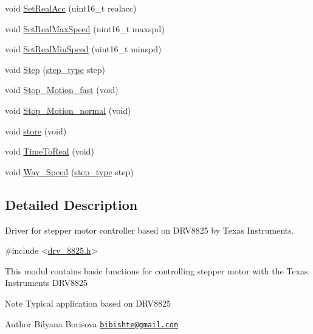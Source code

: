 \begin{DoxyCompactItemize}
\item 
void \hyperlink{group__DRV8825_gaf272b22659980a7a5b9be13378963f67}{Set\-Real\-Acc} (uint16\-\_\-t realacc)
\item 
void \hyperlink{group__DRV8825_ga544f7d7cdcd1fc93afaaa833d1086654}{Set\-Real\-Max\-Speed} (uint16\-\_\-t maxspd)
\item 
void \hyperlink{group__DRV8825_gaf589e1659ecdbe47a83571e1368dc0e2}{Set\-Real\-Min\-Speed} (uint16\-\_\-t minspd)
\item 
void \hyperlink{group__DRV8825_ga7920069eba0a349a19a7e5af32321ad8}{Step} (\hyperlink{group__DRV8825_ga3af682b92aa259509aea217f6dc64356}{step\-\_\-type} step)
\item 
void \hyperlink{group__DRV8825_ga1db502f9943a62943380a04ba0bd52cb}{Stop\-\_\-\-Motion\-\_\-fast} (void)
\item 
void \hyperlink{group__DRV8825_ga95c2965416e69e644b9f5a482707ae9f}{Stop\-\_\-\-Motion\-\_\-normal} (void)
\item 
void \hyperlink{group__DRV8825_gaaefaac2ed4c54f2008d8d236392c7261}{store} (void)
\item 
void \hyperlink{group__DRV8825_gaec239a01fef85140bc7c12fa612f421b}{Time\-To\-Real} (void)
\item 
void \hyperlink{group__DRV8825_ga102f936b773a4a26032cc6b8cd1a273d}{Way\-\_\-\-Speed} (\hyperlink{group__DRV8825_ga3af682b92aa259509aea217f6dc64356}{step\-\_\-type} step)
\end{DoxyCompactItemize}


\subsection{Detailed Description}
Driver for stepper motor controller based on D\-R\-V8825 by Texas Instruments. 
\begin{DoxyCode}
\textcolor{preprocessor}{#include <\hyperlink{drv__8825_8h}{drv\_8825.h}>} 
\end{DoxyCode}


This modul contains basic functions for controlling stepper motor with the Texas Instruments D\-R\-V8825

\begin{DoxyNote}{Note}
Typical application based on D\-R\-V8825 
\end{DoxyNote}
\begin{DoxyAuthor}{Author}
Bilyana Borisova \href{mailto:bibishte@gmail.com}{\tt bibishte@gmail.\-com} 
\end{DoxyAuthor}


